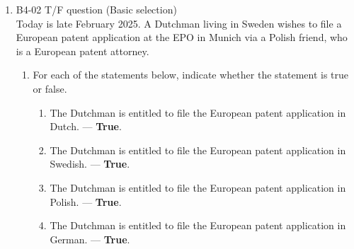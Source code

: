 \documentclass{report}
\begin{document}
\begin{enumerate}[label=\textbf{Answer \arabic*}]
\begin{enumerate}[label=\textbf{Answer \arabic*}]

    \item %
    B4-02 \quad T/F question (Basic selection) \\
    Today is late February 2025. A Dutchman living in Sweden wishes to file a European patent application at the EPO in Munich via a Polish friend, who is a European patent attorney.
    
    \begin{enumerate}[label=(\alph*)]
        \item For each of the statements below, indicate whether the statement is true or false.
        \begin{enumerate}[label={(\alph{enumi}.\arabic*)}]
            \item The Dutchman is entitled to file the European patent application in Dutch. --- \textbf{True}.
            \item The Dutchman is entitled to file the European patent application in Swedish.  --- \textbf{True}.
            \item The Dutchman is entitled to file the European patent application in Polish.  --- \textbf{True}.
            \item The Dutchman is entitled to file the European patent application in German.  --- \textbf{True}.
        \end{enumerate}
        

\end{enumerate}
\end{enumerate}
\end{enumerate}
\end{document}
